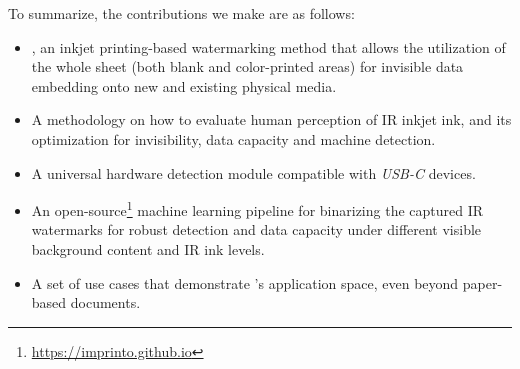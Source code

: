 \vspace{0.2cm}
To summarize, the contributions we make are as follows:
\begin{itemize}[leftmargin=0.5cm]
    \item  \systemName, an inkjet printing-based watermarking method that allows the utilization of the whole sheet (both blank and color-printed areas) for invisible data embedding onto new and existing physical media.
    \item A methodology on how to evaluate human perception of IR inkjet ink, and its optimization for invisibility, data capacity and machine detection.
    \item A universal hardware detection module compatible with \textit{USB-C} devices.
    \item An open-source\footnote{\url{https://imprinto.github.io}} machine learning pipeline for binarizing the captured IR watermarks for robust detection and data capacity under different visible background content and IR ink levels.
    \item A set of use cases that demonstrate  \systemName's application space, even beyond paper-based documents.
\end{itemize}